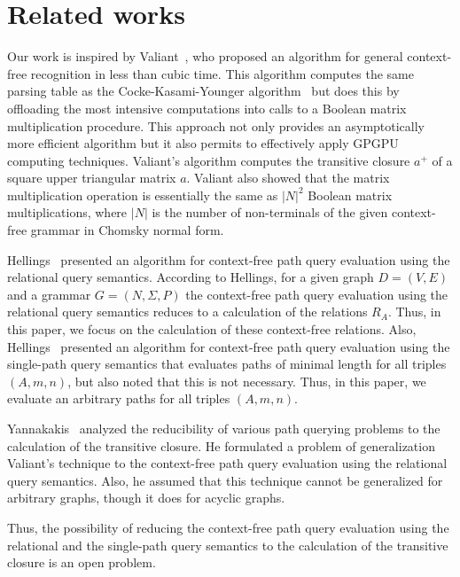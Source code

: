 \section{Related works} \label{section_related}
Our work is inspired by Valiant~\cite{valiant}, who proposed an algorithm for general context-free recognition in less than cubic time. This algorithm computes the same parsing table as the Cocke-Kasami-Younger algorithm~\cite{kasami, younger} but does this by offloading the most intensive computations into calls to a Boolean matrix multiplication procedure. This approach not only provides an asymptotically more efficient algorithm but it also permits to effectively apply GPGPU computing techniques. Valiant's algorithm computes the transitive closure $a^+$ of a square upper triangular matrix $a$. Valiant also showed that the matrix multiplication operation is essentially the same as $|N|^2$ Boolean matrix multiplications, where $|N|$ is the number of non-terminals of the given context-free grammar in Chomsky normal form.

Hellings~\cite{hellingsRelational} presented an algorithm for context-free path query evaluation using the relational query semantics. According to Hellings, for a given graph $D = (V, E)$ and a grammar $G = (N, \Sigma, P)$ the context-free path query evaluation using the relational query semantics reduces to a calculation of the relations $R_A$. Thus, in this paper, we focus on the calculation of these context-free relations. Also, Hellings~\cite{hellingsRelational} presented an algorithm for context-free path query evaluation using the single-path query semantics that evaluates paths of minimal length for all triples $(A,m,n)$, but also noted that this is not necessary. Thus, in this paper, we evaluate an arbitrary paths for all triples $(A,m,n)$.

Yannakakis~\cite{transitive-closure} analyzed the reducibility of various path querying problems to the calculation of the transitive closure. He formulated a problem of generalization Valiant's technique to the context-free path query evaluation using the relational query semantics. Also, he assumed that this technique cannot be generalized for arbitrary graphs, though it does for acyclic graphs.

Thus, the possibility of reducing the context-free path query evaluation using the relational and the single-path query semantics to the calculation of the transitive closure is an open problem.